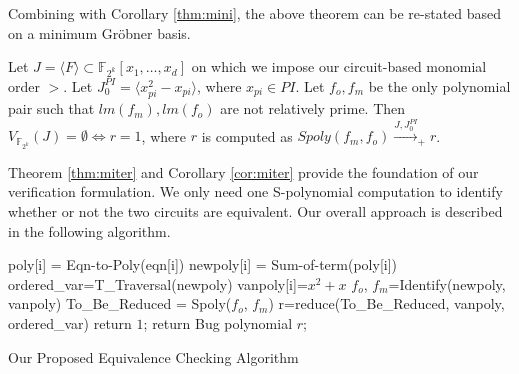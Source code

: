 Combining with Corollary \ref{thm:mini}, the above theorem can be
re-stated based on a minimum Gr\"obner basis. 
\begin{Corollary}\label{cor:miter}
Let $J=\langle F \rangle \subset \mathbb{F}_{2^k}[x_{1},\dots,x_{d}]$ 
on which we impose our circuit-based monomial order $>$.
Let $J_0^{PI}=\langle x_{pi}^{2}-x_{pi}\rangle$, where $x_{pi}\in PI$.
Let $f_o, f_m$ be the only polynomial pair such that $lm(f_m),
lm(f_o)$ are not relatively prime. Then
$V_{\mathbb{F}_{2^k}}(J)=\emptyset \iff r=1$, where $r$ is computed as
$Spoly(f_m,f_o) \stackrel{J,J_0^{PI}}{\longrightarrow}_+ r$.

\end{Corollary}

Theorem \ref{thm:miter} and Corollary \ref{cor:miter} provide the
foundation of our verification formulation. We only need one
S-polynomial computation to identify whether or not the two circuits
are equivalent. Our overall approach is described in the following
algorithm. 


\begin{algorithm}[hbt]
\SetAlgoNoLine


  	{
  		poly[i] = Eqn-to-Poly(eqn[i])\;
  		newpoly[i] = Sum-of-term(poly[i])\;
	}
ordered\_var=T\_Traversal(newpoly)\;
	{
    	vanpoly[i]=$x^2+x$\;
	}    
{$f_{o}$, $f_{m}$}=Identify(newpoly, vanpoly)\;
To\_Be\_Reduced = Spoly($f_{o}$, $f_{m}$)\;
r=reduce(To\_Be\_Reduced, vanpoly, ordered\_var)\;
   {
   	 return $1$;
   }
   {
   	 return Bug polynomial $r$; %
   }	 

\caption{Our Proposed Equivalence Checking Algorithm}\label{alg:ecall}
\end{algorithm}


